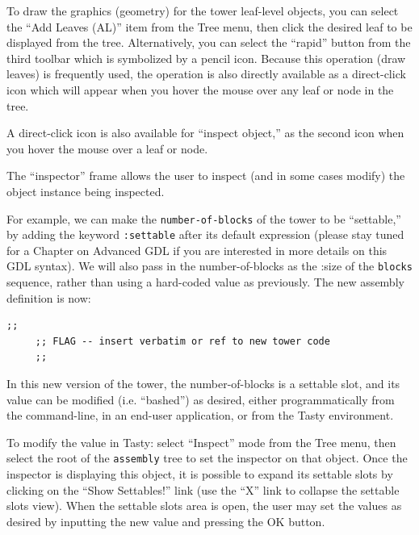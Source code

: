 \documentclass [11pt]{book}
\begin{document}
To draw the graphics (geometry) for the tower leaf-level
objects, you can select the ``Add Leaves (AL)'' item from the Tree
menu, then click the desired leaf to be displayed from the
tree. Alternatively, you can select the ``rapid'' button from the
third toolbar which is symbolized by a pencil icon. Because this
operation (draw leaves) is frequently used, the operation is also
directly available as a direct-click icon which will appear when you
hover the mouse over any leaf or node in the tree.



A direct-click icon is also available for ``inspect
object,'' as the second icon when you hover the mouse over a leaf or
node.



The ``inspector'' frame allows the user to inspect (and in
some cases modify) the object instance being inspected.



For example, we can make the \texttt{number-of-blocks} of the tower to be ``settable,'' by adding the keyword \texttt{:settable} after its default expression (please stay tuned for a Chapter  on Advanced GDL if you are interested in more details on this GDL
syntax). We will also pass in the number-of-blocks as the :size of
the \texttt{blocks} sequence, rather than using a hard-coded value as
previously. The new assembly definition is now:

\begin{verbatim};;
	 ;; FLAG -- insert verbatim or ref to new tower code
	 ;; 
\end{verbatim}



In this new version of the tower, the number-of-blocks is a
settable slot, and its value can be modified (i.e. ``bashed'') as
desired, either programmatically from the command-line, in an end-user
application, or from the Tasty environment.



To modify the value in Tasty: select ``Inspect'' mode from the Tree
menu, then select the root of the \texttt{assembly} tree to set the inspector on that object. Once the
inspector is displaying this object, it is possible to expand its
settable slots by clicking on the ``Show Settables!''  link (use the
``X'' link to collapse the settable slots view). When the settable
slots area is open, the user may set the values as desired by
inputting the new value and pressing the OK button.
\end{document}
